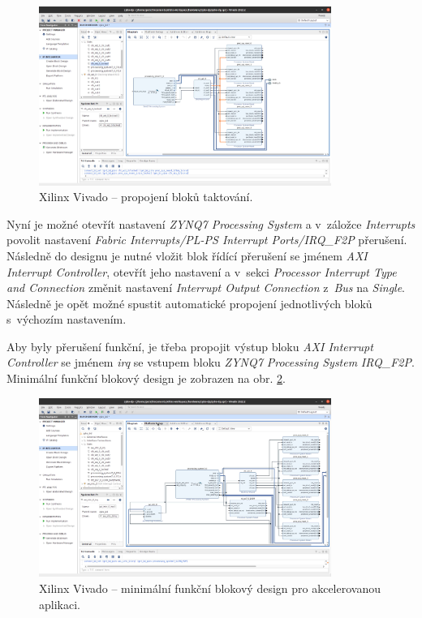\documentclass[a4paper, twoside, 11pt]{article}
\newcommand{\fbar}{\FloatBarrier}
\begin{document}
\begin{appendices}
		\begin{figure}[htbp!]
			\centering
			\includegraphics[width=0.85\textwidth]{src/png/zybo-xilinx-vivado-flow/zybo-xilinx-vivado-flow-12.jpg}
			\caption{Xilinx Vivado – propojení bloků taktování.}
			\label{fig:zybo-xilinx-vivado-flow-12}
		\end{figure}

		\fbar

		Nyní je možné otevřít nastavení \textit{ZYNQ7 Processing System} a v~záložce \textit{Interrupts} povolit nastavení \textit{Fabric Interrupts/PL-PS Interrupt Ports/IRQ\_F2P} přerušení. Následně do designu je nutné vložit blok řídící přerušení se jménem \textit{AXI Interrupt Controller}, otevřít jeho nastavení a v~sekci \textit{Processor Interrupt Type and Connection} změnit nastavení \textit{Interrupt Output Connection} z~\textit{Bus} na \textit{Single}. Následně je opět možné spustit automatické propojení jednotlivých bloků s~výchozím nastavením.\par
		Aby byly přerušení funkční, je třeba propojit výstup bloku \textit{AXI Interrupt Controller} se jménem \textit{irq} se vstupem bloku \textit{ZYNQ7 Processing System} \textit{IRQ\_F2P}. Minimální funkční blokový design je zobrazen na obr. \ref{fig:zybo-xilinx-vivado-flow-17}.

		\begin{figure}[htbp!]
			\centering
			\includegraphics[width=0.85\textwidth]{src/png/zybo-xilinx-vivado-flow/zybo-xilinx-vivado-flow-17.jpg}
			\caption{Xilinx Vivado – minimální funkční blokový design pro akcelerovanou aplikaci.}
			\label{fig:zybo-xilinx-vivado-flow-17}
		\end{figure}


\end{appendices}
\end{document}
